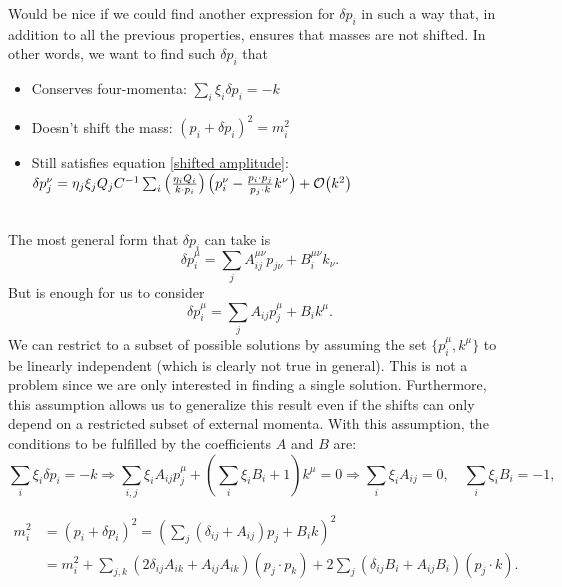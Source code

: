 \documentclass{article}
\begin{document}
Would be nice if we could find another expression for $\delta p_i$ in such a way that, in addition to all the previous properties, ensures that masses are not shifted. In other words, we want to find such $\delta p_i$ that
\begin{itemize}
	\item Conserves four-momenta: $\sum_i \xi_i \delta p_i = -k$
	\item Doesn't shift the mass: $(p_i+\delta p_i)^2 = m_i^2$
	\item Still satisfies equation \eqref{shifted amplitude}: $\delta p_j^\nu =\eta_j\xi_jQ_jC^{-1}\sum_{i} \left(\frac{\eta_i Q_i}{k\cdot p_i}\right)  \left(p_i^\nu - \frac{p_i\cdot p_j }{p_j\cdot k}k^\nu\right) + \order{k^2}$
\end{itemize}
\
\\
The most general form that $\delta p_i$ can take is
\begin{equation*}
\delta p_i^\mu = \sum_j A_{ij}^{\mu\nu} p_{j\nu} + B_{i}^{\mu\nu} k_\nu.
\end{equation*}
But is enough for us to consider
\begin{equation*}
\delta p_i^\mu = \sum_j A_{ij} p_{j}^\mu + B_{i} k^\mu.
\end{equation*}
We can restrict to a subset of possible solutions by assuming the set $\{p_i^\mu, k^\mu\}$ to be linearly independent (which is clearly not true in general). This is not a problem since we are only interested in finding a single solution. Furthermore, this assumption allows us to generalize this result even if the shifts can only depend on a restricted subset of external momenta. With this assumption, the conditions to be fulfilled by the coefficients $A$ and $B$ are:
\begin{equation*}
\sum_i \xi_i \delta p_i = -k \Longrightarrow \sum_{i,j} \xi_iA_{ij} p_{j}^\mu + \left(\sum_i \xi_i B_{i}+ 1\right) k^\mu = 0 \Longrightarrow \sum_i \xi_iA_{ij} = 0, \quad \sum_i \xi_iB_{i} =  -1,
\end{equation*}

\begin{align*}
m_i^2 &= (p_i+\delta p_i)^2
= \left(\sum_j \left(\delta_{ij} + A_{ij}\right) p_{j} + B_{i} k\right)^2 \\&
= m_i^2
+\sum_{j,k} \left(2\delta_{ij}A_{ik}+A_{ij}A_{ik}\right)(p_{j}\cdot p_{k})
+2\sum_j \left(\delta_{ij}B_{i}+A_{ij}B_{i}\right)(p_{j}\cdot k).
\end{align*}
\end{document}
